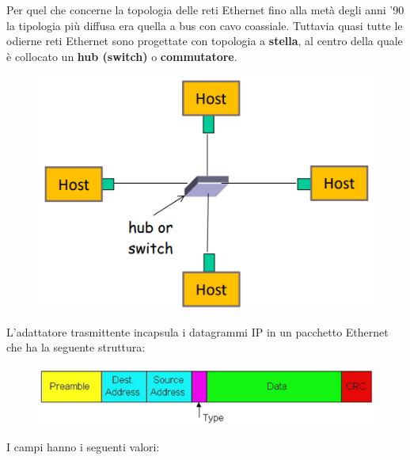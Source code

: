\documentclass[11pt,a4paper,oneside]{book}
\theoremstyle{definition}
\begin{document}
\pagebreak

Per quel che concerne la topologia delle reti Ethernet fino alla metà degli anni '90 la tipologia più diffusa era quella a bus con cavo coassiale.
Tuttavia quasi tutte le odierne reti Ethernet sono progettate con topologia a \textbf{stella}, al centro della quale è collocato un \textbf{hub (switch)} o \textbf{commutatore}.

\begin{figure}[!h]
	\includegraphics[scale=0.37]{Immagini/Star_lan.png}
	\centering
\end{figure}

L’adattatore trasmittente incapsula i datagrammi IP in un
pacchetto Ethernet che ha la seguente struttura:

\begin{figure}[!h]
	\includegraphics[scale=0.4]{Immagini/Ethernet_pkt.png}
	\centering
\end{figure}

I campi hanno i seguenti valori:
\end{document}

